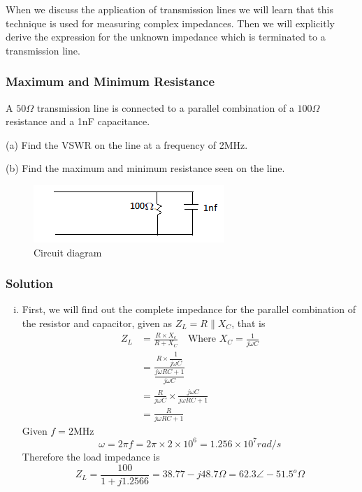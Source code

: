 When we discuss the application of transmission lines we will learn that this technique is used for measuring complex impedances. Then we will explicitly derive the expression for the unknown impedance which is terminated to a transmission line. 

\begin{exmp}
\subsubsection*{Maximum and Minimum Resistance}
A $50\Omega$ transmission line is connected to a parallel combination of a $100\Omega$ resistance and a 1nF capacitance.

(a) Find the VSWR on the line at a frequency of 2MHz.

(b) Find the maximum and minimum resistance seen on the line.

\begin{figure}[h]
\centering
\includegraphics[width=\linewidth]{./graphics/d1}
\caption{Circuit diagram}
\end{figure}

\subsubsection*{Solution}
\begin{enumerate}[(i)]
\item First, we will find out the complete impedance for the parallel combination of the resistor and capacitor, given as $Z_{L}=R\parallel X_C$, that is
\begin{align*}
Z_L&=\frac{R \times X_c}{R + X_C}\quad\text{Where }X_C =\frac{1}{j\omega C}\\
&=\frac{R\times\dfrac{1}{j\omega C}}{\dfrac{j\omega RC + 1}{j\omega C}}\\
&=\frac{R}{j\omega C} \times \frac{j \omega C}{j\omega RC + 1}\\
&=\frac{R}{j\omega RC + 1}
\end{align*}
Given $f=2$MHz
\begin{dmath*}
\omega = 2\pi f
= 2\pi \times 2 \times 10^{6}
=1.256\times 10^{7}rad/s    
\end{dmath*}
Therefore the load impedance is
\begin{dmath*}
Z_{L}=\frac{100}{1 + j1.2566}
= 38.77-j48.7\Omega
= 62.3\angle-51.5^o\Omega
\end{dmath*}


\end{enumerate}
\end{exmp}
